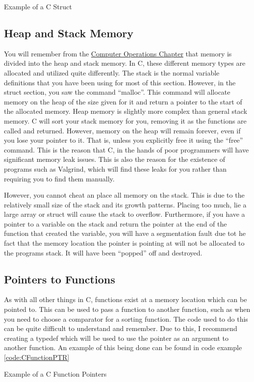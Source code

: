 			\begin{code}
				\caption{Example of a C Struct}
				\label{code:CStructs}
			\end{code}
		\subsection{Heap and Stack Memory}
		\index{Stack}
			You will remember from the \hyperref[ch:ComputerOperations]{Computer Operations Chapter} that memory is divided into the heap and stack memory.
			In C, these different memory types are allocated and utilized quite differently.
			The stack is the normal variable definitions that you have been using for most of this section.
			However, in the struct section, you saw the command ``malloc''.
			This command will allocate memory on the heap of the size given for it and return a pointer to the start of the allocated memory.
			\index{Stack}
			Heap memory is slightly more complex than general stack memory.
			C will sort your stack memory for you, removing it as the functions are called and returned.
			However, memory on the heap will remain forever, even if you lose your pointer to it.
			That is, unless you explicitly free it using the ``free'' command.
			This is the reason that C, in the hands of poor programmers will have significant memory leak issues.
			This is also the reason for the existence of programs such as Valgrind, which will find these leaks for you rather than requiring you to find them manually.

			However, you cannot cheat an place all memory on the stack.
			This is due to the relatively small size of the stack and its growth patterns.
			Placing too much, lie a large array or struct will cause the stack to overflow.
			Furthermore, if you have a pointer to a variable on the stack and return the pointer at the end of the function that created the variable,
			you will have a segmentation fault due tot he fact that the memory location the pointer is pointing at will not be allocated to the programs stack.
			It will have been ``popped'' off and destroyed.

		\subsection{Pointers to Functions}
			As with all other things in C, functions exist at a memory location which can be pointed to.
			This can be used to pass a function to another function, such as when you need to choose a comparator for a sorting function.
			\index{Function Pointers}
			The code used to do this can be quite difficult to understand and remember.
			Due to this, I recommend creating a typedef which will be used to use the pointer as an argument to another function.
			An example of this being done can be found in code example \ref{code:CFunctionPTR}
			\begin{code}
				\ccode{./CFunctionPTR.c}
				\caption{Example of a C Function Pointers}
				\label{code:CFunctionPTR}
			\end{code}
